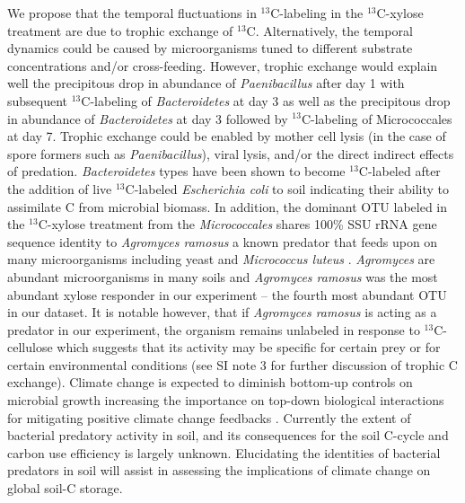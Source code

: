 We propose that the temporal fluctuations in $^{13}$C-labeling in the
$^{13}$C-xylose treatment are due to trophic exchange of $^{13}$C.
Alternatively, the temporal dynamics could be caused by microorganisms tuned to
different substrate concentrations and/or cross-feeding. However, trophic exchange
would explain well the precipitous drop in abundance of
\textit{Paenibacillus} after day 1 with subsequent $^{13}$C-labeling of
\textit{Bacteroidetes} at day 3 as well as the precipitous drop in abundance of
\textit{Bacteroidetes} at day 3 followed by $^{13}$C-labeling of Micrococcales at day 7.
Trophic exchange could be enabled by mother cell lysis (in the case of spore formers
such as \textit{Paenibacillus}), viral lysis, and/or the direct indirect effects of
predation. \textit{Bacteroidetes} types have been shown to become
$^{13}$C-labeled after the addition of live $^{13}$C-labeled
\textit{Escherichia coli} to soil \citep{Lueders2006} indicating their ability to
assimilate C from microbial biomass. In addition, the dominant OTU labeled in the $^{13}$C-xylose
treatment from the \textit{Micrococcales} shares 100\% SSU rRNA gene sequence identity
to \textit{Agromyces ramosus} a known predator that
feeds upon on many microorganisms including yeast and \textit{Micrococcus luteus}
\citep{16346402}. \textit{Agromyces} are abundant microorganisms in many soils
and \textit{Agromyces ramosus} was the most abundant xylose responder in our
experiment -- the fourth most abundant OTU in our dataset. It is notable however,
that if \textit{Agromyces ramosus} is acting as a predator in our experiment, the
organism remains unlabeled in response to $^{13}$C-cellulose which suggests that its
activity may be specific for certain prey or for certain environmental
conditions  (see SI note 3 for further discussion of trophic C exchange).
Climate change is expected to diminish bottom-up controls on microbial growth
increasing the importance on top-down biological interactions for mitigating
positive climate change feedbacks \citep{Crowther2015}. Currently the extent
of bacterial predatory activity in soil, and its consequences for the soil C-cycle
and carbon use efficiency is largely unknown. Elucidating the identities of
bacterial predators in soil will assist in assessing the implications of
climate change on global soil-C storage.

